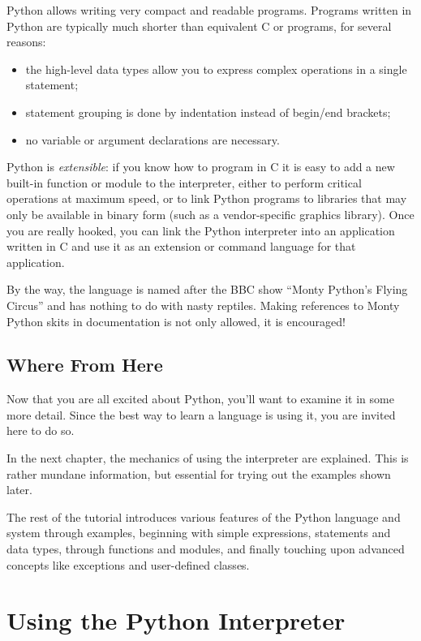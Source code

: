 \documentclass{manual}
\begin{document}
Python allows writing very compact and readable programs.  Programs
written in Python are typically much shorter than equivalent C or
\Cpp{} programs, for several reasons:
\begin{itemize}
\item
the high-level data types allow you to express complex operations in a
single statement;
\item
statement grouping is done by indentation instead of begin/end
brackets;
\item
no variable or argument declarations are necessary.
\end{itemize}

Python is \emph{extensible}: if you know how to program in C it is easy
to add a new built-in function or module to the interpreter, either to
perform critical operations at maximum speed, or to link Python
programs to libraries that may only be available in binary form (such
as a vendor-specific graphics library).  Once you are really hooked,
you can link the Python interpreter into an application written in C
and use it as an extension or command language for that application.

By the way, the language is named after the BBC show ``Monty Python's
Flying Circus'' and has nothing to do with nasty reptiles.  Making
references to Monty Python skits in documentation is not only allowed,
it is encouraged!

\section{Where From Here \label{where}}

Now that you are all excited about Python, you'll want to examine it
in some more detail.  Since the best way to learn a language is
using it, you are invited here to do so.

In the next chapter, the mechanics of using the interpreter are
explained.  This is rather mundane information, but essential for
trying out the examples shown later.

The rest of the tutorial introduces various features of the Python
language and system through examples, beginning with simple
expressions, statements and data types, through functions and modules,
and finally touching upon advanced concepts like exceptions
and user-defined classes.

\chapter{Using the Python Interpreter \label{using}}
\end{document}
